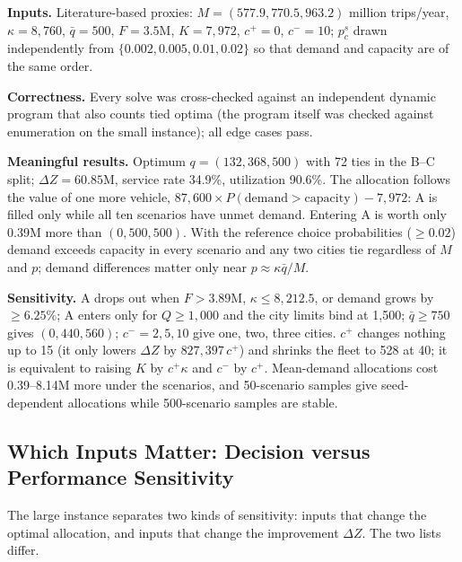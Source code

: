 \documentclass[10pt,a4paper]{article}
\begin{document}
\textbf{Inputs.} Literature-based proxies: $M=(577.9, 770.5, 963.2)$ million trips/year, $\kappa=8{,}760$, $\bar q=500$, $F=3.5$M, $K=7{,}972$, $c^+=0$, $c^-=10$;
$p_c^s$ drawn independently from $\{0.002,0.005,0.01,0.02\}$ so that demand and capacity are of the same order.

\textbf{Correctness.} Every solve was cross-checked against an independent dynamic program that also counts tied optima (the program itself was checked against enumeration on the small instance); all edge cases pass.

\textbf{Meaningful results.} Optimum $q=(132,368,500)$ with 72 ties in the B--C split; $\Delta Z=60.85$M, service rate 34.9\%, utilization 90.6\%.
The allocation follows the value of one more vehicle, $87{,}600\times P(\text{demand}>\text{capacity})-7{,}972$: A is filled only while all ten scenarios have unmet demand.
Entering A is worth only 0.39M more than $(0,500,500)$.
With the reference choice probabilities ($\ge0.02$) demand exceeds capacity in every scenario and any two cities tie regardless of $M$ and $p$; demand differences matter only near $p\approx\kappa\bar q/M$.

\textbf{Sensitivity.} A drops out when $F>3.89$M, $\kappa\le8{,}212.5$, or demand grows by $\ge6.25\%$; A enters only for $Q\ge1{,}000$ and the city limits bind at 1{,}500;
$\bar q\ge750$ gives $(0,440,560)$; $c^-=2,5,10$ give one, two, three cities.
$c^+$ changes nothing up to 15 (it only lowers $\Delta Z$ by $827{,}397\,c^+$) and shrinks the fleet to 528 at 40; it is equivalent to raising $K$ by $c^+\kappa$ and $c^-$ by $c^+$.
Mean-demand allocations cost 0.39--8.14M more under the scenarios, and 50-scenario samples give seed-dependent allocations while 500-scenario samples are stable.

\subsection{Which Inputs Matter: Decision versus Performance Sensitivity}
The large instance separates two kinds of sensitivity: inputs that change the optimal allocation, and inputs that change the improvement $\Delta Z$. The two lists differ.
\end{document}
